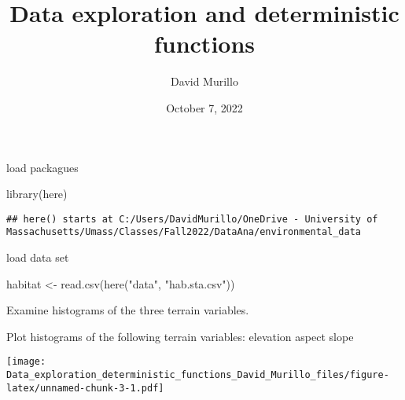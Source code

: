 \documentclass[
]{article}
\title{Data exploration and deterministic functions}
\author{David Murillo}
\date{October 7, 2022}
\newenvironment{Shaded}{\begin{snugshade}}{\end{snugshade}}
\newcommand{\AttributeTok}[1]{\textcolor[rgb]{0.77,0.63,0.00}{#1}}
\newcommand{\FunctionTok}[1]{\textcolor[rgb]{0.00,0.00,0.00}{#1}}
\newcommand{\NormalTok}[1]{#1}
\newcommand{\OtherTok}[1]{\textcolor[rgb]{0.56,0.35,0.01}{#1}}
\newcommand{\SpecialCharTok}[1]{\textcolor[rgb]{0.00,0.00,0.00}{#1}}
\newcommand{\StringTok}[1]{\textcolor[rgb]{0.31,0.60,0.02}{#1}}
\begin{document}
\maketitle

{
\setcounter{tocdepth}{2}
\tableofcontents
}
load packagues

\begin{Shaded}
\begin{Highlighting}[]
\FunctionTok{library}\NormalTok{(here)}
\end{Highlighting}
\end{Shaded}

\begin{verbatim}
## here() starts at C:/Users/DavidMurillo/OneDrive - University of Massachusetts/Umass/Classes/Fall2022/DataAna/environmental_data
\end{verbatim}

load data set

\begin{Shaded}
\begin{Highlighting}[]
\NormalTok{habitat }\OtherTok{\textless{}{-}} \FunctionTok{read.csv}\NormalTok{(}\FunctionTok{here}\NormalTok{(}\StringTok{"data"}\NormalTok{, }\StringTok{"hab.sta.csv"}\NormalTok{))}
\end{Highlighting}
\end{Shaded}

Examine histograms of the three terrain variables.

Plot histograms of the following terrain variables: elevation aspect
slope

\begin{Shaded}
\end{Shaded}

\texttt{[image: Data\_exploration\_deterministic\_functions\_David\_Murillo\_files/figure-latex/unnamed-chunk-3-1.pdf]}

\begin{Shaded}
\end{Shaded}
\end{document}
